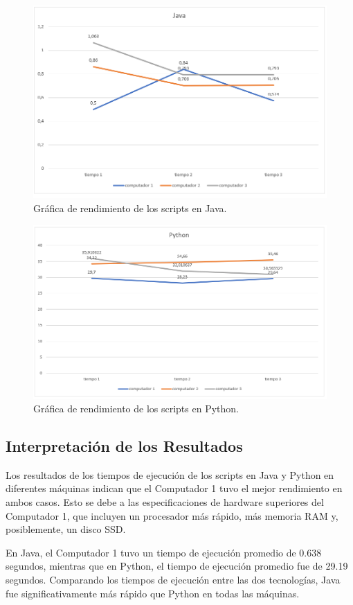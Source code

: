 \documentclass[conference]{IEEEtran}
\begin{document}
\begin{figure}[ht]
\centering
\includegraphics[width=0.8\linewidth]{java.png}
\caption{Gráfica de rendimiento de los scripts en Java.}
\label{fig:grafica-rendimiento}
\end{figure}
\begin{figure}[ht]
\centering
\includegraphics[width=0.8\linewidth]{Python.png}
\caption{Gráfica de rendimiento de los scripts en Python.}
\label{fig:grafica-rendimiento}
\end{figure}

\subsection{Interpretación de los Resultados}

Los resultados de los tiempos de ejecución de los scripts en Java y Python en diferentes máquinas indican que el Computador 1 tuvo el mejor rendimiento en ambos casos. Esto se debe a las especificaciones de hardware superiores del Computador 1, que incluyen un procesador más rápido, más memoria RAM y, posiblemente, un disco SSD.

En Java, el Computador 1 tuvo un tiempo de ejecución promedio de 0.638 segundos, mientras que en Python, el tiempo de ejecución promedio fue de 29.19 segundos. Comparando los tiempos de ejecución entre las dos tecnologías, Java fue significativamente más rápido que Python en todas las máquinas.
\end{document}

